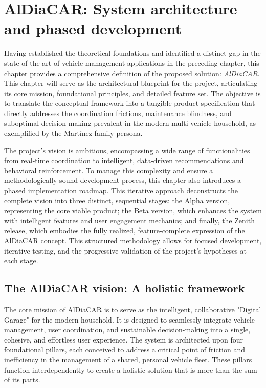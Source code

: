 \chapter{AlDiaCAR: System architecture and phased development}

Having established the theoretical foundations and identified a distinct gap in the state-of-the-art of vehicle management applications in the preceding chapter, this chapter provides a comprehensive definition of the proposed solution: \textit{AlDiaCAR}. This chapter will serve as the architectural blueprint for the project, articulating its core mission, foundational principles, and detailed feature set. The objective is to translate the conceptual framework into a tangible product specification that directly addresses the coordination frictions, maintenance blindness, and suboptimal decision-making prevalent in the modern multi-vehicle household, as exemplified by the Martínez family persona.

\textgap

The project's vision is ambitious, encompassing a wide range of functionalities from real-time coordination to intelligent, data-driven recommendations and behavioral reinforcement. To manage this complexity and ensure a methodologically sound development process, this chapter also introduces a phased implementation roadmap. This iterative approach deconstructs the complete vision into three distinct, sequential stages: the Alpha version, representing the core viable product; the Beta version, which enhances the system with intelligent features and user engagement mechanics; and finally, the Zenith release, which embodies the fully realized, feature-complete expression of the AlDiaCAR concept. This structured methodology allows for focused development, iterative testing, and the progressive validation of the project's hypotheses at each stage.

\section{The AlDiaCAR vision: A holistic framework}

The core mission of AlDiaCAR is to serve as the intelligent, collaborative "Digital Garage" for the modern household. It is designed to seamlessly integrate vehicle management, user coordination, and sustainable decision-making into a single, cohesive, and effortless user experience. The system is architected upon four foundational pillars, each conceived to address a critical point of friction and inefficiency in the management of a shared, personal vehicle fleet. These pillars function interdependently to create a holistic solution that is more than the sum of its parts.

